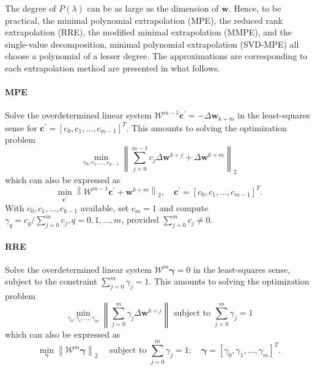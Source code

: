 The degree of \(P(\lambda)\) can be as large as the dimension of \(\mathbf w\).
Hence, to be practical, the minimal polynomial extrapolation (MPE), the reduced rank extrapolation (RRE), the modified minimal extrapolation (MMPE), and the single-value decomposition, minimal polynomial extrapolation (SVD-MPE) all choose a polynomial of a lesser degree.
The approximations are corresponding to each extrapolation method are presented in what follows.

\paragraph{MPE}

Solve the overdetermined linear system \(\mathscr W^{m-1} \mathbf c^{\prime}=-\Delta \mathbf w_{k+m}\) in the least-squares sense for \(\mathbf c^{\prime}=\left[c_{0}, c_{1}, \ldots, c_{m-1}\right]^{T}\).
This amounts to solving the optimization problem
\begin{equation}
\min _{c_{0}, c_{1}, \ldots, c_{p-1}}\left\|\sum_{j=0}^{m-1} c_{j} \Delta \mathbf w^ {k+j}+\Delta \mathbf w^{k+m}\right\|_2
\end{equation}
which can also be expressed as
\begin{equation}
  \min _{\mathbf c^{\prime}}\left\|\mathscr W^{m-1} \mathbf c^{\prime}+\mathbf w^{k+m}\right\|_2, \quad \mathbf c^{\prime}=\left[c_{0}, c_{1}, \ldots, c_{m-1}\right]^{T} .
\end{equation}
With \(c_{0}, c_{1}, \ldots, c_{k-1}\) available, set \(c_{m}=1\) and compute \(\gamma_{q}=c_{q} / \sum_{j=0}^{m} c_{j}, q=0,1, \ldots, m\), provided \(\sum_{j=0}^{m} c_{j} \neq 0\).

\paragraph{RRE}

Solve the overdetermined linear system \(\mathscr W^{m} \boldsymbol\gamma=0\) in the least-squares sense, subject to the constraint \(\sum_{j=0}^{m} \gamma_{j}=1\).
This amounts to solving the optimization problem
\begin{equation}
\min _{\gamma_{0}, \gamma_{1}, \ldots, \gamma_{m}}\left\|\sum_{j=0}^{m} \gamma_{j} \Delta\mathbf w^{k+j}\right\| \text { subject to } \sum_{j=0}^{m} \gamma_{j}=1
\end{equation}
which can also be expressed as
\begin{equation}
\min _{\boldsymbol\gamma}\left\|\mathscr W^{m} \boldsymbol\gamma\right\|_2 \quad \text { subject to } \sum_{j=0}^{m} \gamma_{j}=1 ; \quad \boldsymbol\gamma=\left[\gamma_{0}, \gamma_{1}, \ldots, \gamma_{m}\right]^{T} .
\end{equation}

